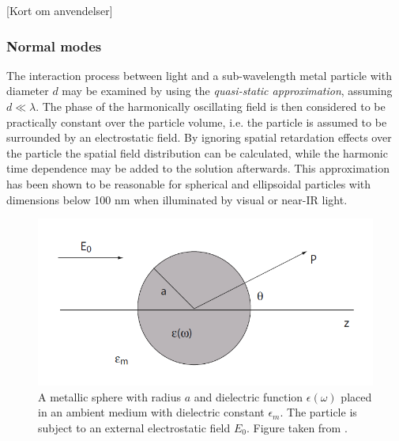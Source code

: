 [Kort om anvendelser]

\subsubsection{Normal modes}
The interaction process between light and a sub-wavelength metal particle with diameter $d$ may be examined by using the \emph{quasi-static approximation}, assuming $d\ll \lambda$. The  phase  of  the  harmonically  oscillating  field is then considered to be practically constant over the particle volume, i.e. the particle is assumed to be surrounded by an electrostatic field. By ignoring spatial retardation effects over the particle the spatial field distribution can be calculated, while the harmonic time dependence may be added to the solution afterwards. This approximation has been shown to be reasonable for spherical and ellipsoidal particles with dimensions below 100 nm when illuminated by visual or near-IR light\cite{maier}.

\begin{figure}
    \centering
    \includegraphics[scale=0.6]{figures/Ch2/SphereNormalMode.PNG}
    \caption{A metallic sphere with radius $a$ and dielectric function $\epsilon(\omega)$ placed in an ambient medium with dielectric constant $\epsilon_m$. The particle is subject to an external electrostatic field $E_0$. Figure taken from \cite{maier}.} 
    \label{fig:normalmode}
\end{figure}

